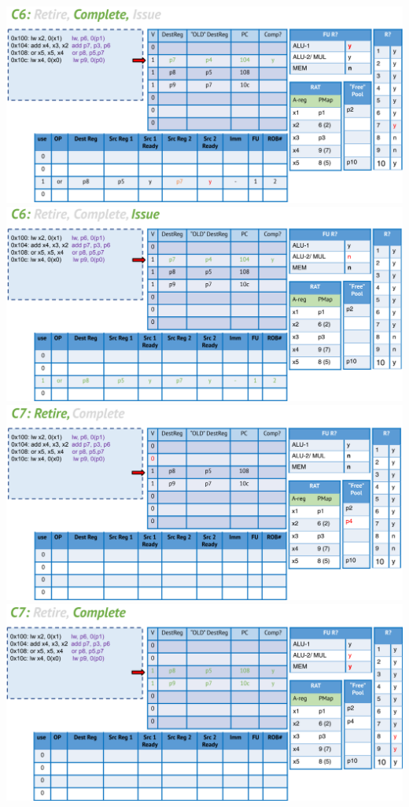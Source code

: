 \documentclass[10pt]{article}
\begin{document}
\begin{center}
\includegraphics*[width=\textwidth]{W5_out_of_order/16.png}\\
\includegraphics*[width=\textwidth]{W5_out_of_order/17.png}\\
\includegraphics*[width=\textwidth]{W5_out_of_order/18.png}\\
\includegraphics*[width=\textwidth]{W5_out_of_order/19.png}\\

\end{center}
\end{document}
